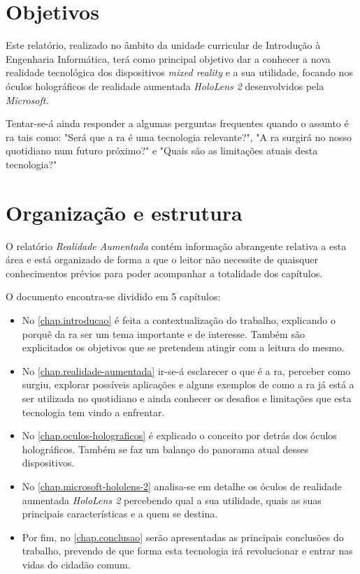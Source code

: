 \documentclass{report}
\begin{document}
\section{Objetivos}
Este relatório, realizado no âmbito da unidade curricular de Introdução à Engenharia Informática, terá como principal objetivo dar a conhecer a nova realidade tecnológica dos dispositivos \textit{mixed reality} e a sua utilidade, focando nos óculos holográficos de realidade aumentada \textit{HoloLens 2} desenvolvidos pela \textit{Microsoft}.

Tentar-se-á ainda responder a algumas perguntas frequentes quando o assunto é \ac{ra} tais como: "Será que a \ac{ra} é uma tecnologia relevante?", "A \ac{ra} surgirá no nosso quotidiano num futuro próximo?" e "Quais são as limitações atuais desta tecnologia?"

\section{Organização e estrutura}
O relatório \textit{Realidade Aumentada} contém informação abrangente relativa a esta área e está organizado de forma a que o leitor não necessite de quaisquer conhecimentos prévios para poder acompanhar a totalidade dos capítulos.

O documento encontra-se dividido em 5 capítulos:
\begin{itemize}
    \item No \autoref{chap.introducao} é feita a contextualização do trabalho, explicando o porquê da \ac{ra} ser um tema importante e de interesse. Também são explicitados os objetivos que se pretendem atingir com a leitura do mesmo.
    \item No \autoref{chap.realidade-aumentada} ir-se-á esclarecer o que é a \ac{ra}, perceber como surgiu, explorar possíveis aplicações e alguns exemplos de como a \ac{ra} já está a ser utilizada no quotidiano e ainda conhecer os desafios e limitações que esta tecnologia tem vindo a enfrentar.
    \item No \autoref{chap.oculos-holograficos} é explicado o conceito por detrás dos óculos holográficos. Também se faz um balanço do panorama atual desses dispositivos.
    \item No \autoref{chap.microsoft-hololens-2} analisa-se em detalhe os óculos de realidade aumentada \textit{HoloLens 2} percebendo qual a sua utilidade, quais as suas principais características e a quem se destina.
    \item Por fim, no \autoref{chap.conclusao} serão apresentadas as principais conclusões do trabalho, prevendo de que forma esta tecnologia irá revolucionar e entrar nas vidas do cidadão comum.
\end{itemize}
\end{document}
